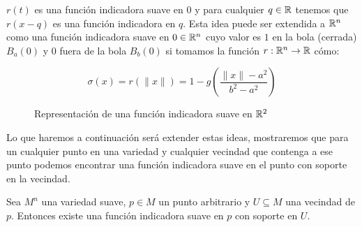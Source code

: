 \begin{example}
	$r(t)$ es una función indicadora suave en $0$  y para cualquier $q \in \mathbb{R}$ tenemos que $r(x-q)$ es una función indicadora en $q$. Esta idea puede ser extendida a $\mathbb{R}^n$ como una función indicadora suave en $0 \in \mathbb{R}^n$  cuyo valor es $1$ en la bola (cerrada) $B_a(0)$ y $0$ fuera de la bola $B_b(0)$ si tomamos la función $r: \mathbb{R}^n \to \mathbb{R}$ cómo:

	\[
		\sigma(x) = r(\|x\|) = 1 - g\left(\frac{\|x\| - a^2}{b^2 - a^2}\right)
	\]
\end{example}

\begin{figure}
\centering

\caption{Representación de una función indicadora suave en $\mathbb{R}^2$}
\end{figure}


Lo que haremos a continuación será extender estas ideas, mostraremos que para un cualquier punto en una variedad y cualquier vecindad que contenga a ese punto podemos encontrar una función indicadora suave en el punto con soporte en la vecindad.

\begin{lemma}\label{Lemma: Existencia de Función Indicadora}
	Sea $M^n$ una variedad suave, $p \in M$ un punto arbitrario y $U \subseteq M$ una vecindad de $p$. Entonces existe una función indicadora suave en $p$ con soporte en $U$.
\end{lemma}

